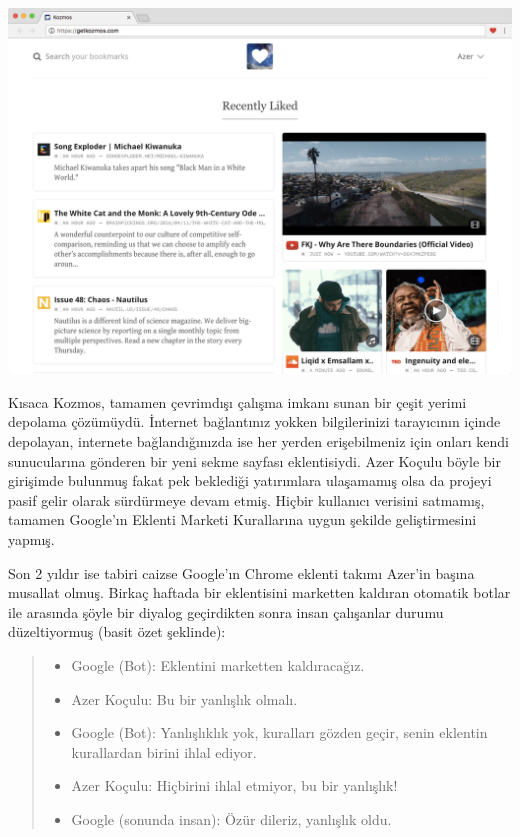 \documentclass[11pt]{article}
\begin{document}
\begin{center}
\includegraphics[width=.9\linewidth]{gorseller/kozmos.png}
\end{center}

Kısaca Kozmos, tamamen çevrimdışı çalışma imkanı sunan bir çeşit yerimi
depolama çözümüydü. İnternet bağlantınız yokken bilgilerinizi tarayıcının
içinde depolayan, internete bağlandığınızda ise her yerden erişebilmeniz için
onları kendi sunucularına gönderen bir yeni sekme sayfası eklentisiydi. Azer
Koçulu böyle bir girişimde bulunmuş fakat pek beklediği yatırımlara ulaşamamış
olsa da projeyi pasif gelir olarak sürdürmeye devam etmiş. Hiçbir kullanıcı
verisini satmamış, tamamen Google'ın Eklenti Marketi Kurallarına uygun
şekilde geliştirmesini yapmış.

Son 2 yıldır ise tabiri caizse Google'ın Chrome eklenti takımı Azer'in başına
musallat olmuş. Birkaç haftada bir eklentisini marketten kaldıran otomatik
botlar ile arasında şöyle bir diyalog geçirdikten sonra insan çalışanlar
durumu düzeltiyormuş (basit özet şeklinde):

\begin{quote}
\begin{itemize}
\item Google (Bot): Eklentini marketten kaldıracağız.
\item Azer Koçulu: Bu bir yanlışlık olmalı.
\item Google (Bot): Yanlışlıklık yok, kuralları gözden geçir, senin eklentin
kurallardan birini ihlal ediyor.
\item Azer Koçulu: Hiçbirini ihlal etmiyor, bu bir yanlışlık!
\item Google (sonunda insan): Özür dileriz, yanlışlık oldu.
\end{itemize}
\end{quote}
\end{document}
